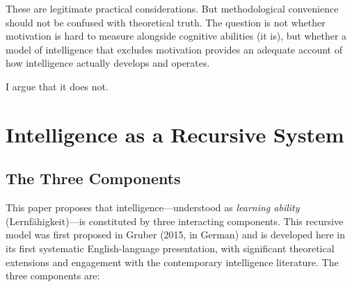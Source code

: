 \documentclass[12pt,a4paper]{article}
\begin{document}
These are legitimate practical considerations. But methodological convenience should not be confused with theoretical truth. The question is not whether motivation is hard to measure alongside cognitive abilities (it is), but whether a model of intelligence that excludes motivation provides an adequate account of how intelligence actually develops and operates.

I argue that it does not.


\section{Intelligence as a Recursive System}

\subsection{The Three Components}

This paper proposes that intelligence---\hspace{0pt}understood as \emph{learning ability} (Lernf\"ahigkeit)---\hspace{0pt}is constituted by three interacting components. This recursive model was first proposed in Gruber (2015, in German) and is developed here in its first systematic English-language presentation, with significant theoretical extensions and engagement with the contemporary intelligence literature. The three components are:
\end{document}
